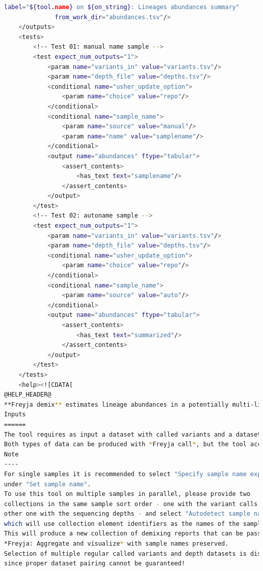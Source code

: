 \begin{lstlisting}[language=bash, caption=tool wrapper for Freyja: Demix lineage abundances, label=list:methods:wrapper-freyja-demix]
              label="${tool.name} on ${on_string}: Lineages abundances summary"
              from_work_dir="abundances.tsv"/>
    </outputs>
    <tests>
        <!-- Test 01: manual name sample -->
        <test expect_num_outputs="1">
            <param name="variants_in" value="variants.tsv"/>
            <param name="depth_file" value="depths.tsv"/>
            <conditional name="usher_update_option">
                <param name="choice" value="repo"/>
            </conditional>
            <conditional name="sample_name">
                <param name="source" value="manual"/>
                <param name="name" value="samplename"/>
            </conditional>
            <output name="abundances" ftype="tabular">
                <assert_contents>
                    <has_text text="samplename"/>
                </assert_contents>
            </output>
        </test>
        <!-- Test 02: autoname sample -->
        <test expect_num_outputs="1">
            <param name="variants_in" value="variants.tsv"/>
            <param name="depth_file" value="depths.tsv"/>
            <conditional name="usher_update_option">
                <param name="choice" value="repo"/>
            </conditional>
            <conditional name="sample_name">
                <param name="source" value="auto"/>
            </conditional>
            <output name="abundances" ftype="tabular">
                <assert_contents>
                    <has_text text="summarized"/>
                </assert_contents>
            </output>
        </test>
    </tests>
    <help><![CDATA[
@HELP_HEADER@
**Freyja demix** estimates lineage abundances in a potentially multi-lineage input sample.
Inputs
======
The tool requires as input a dataset with called variants and a dataset with genome-wide sequencing depth information.
Both types of data can be produced with *Freyja call*, but the tool accepts variant calls also in VCF format.
Note
----
For single samples it is recommended to select "Specify sample name explicitly"
under "Set sample name".
To use this tool on multiple samples in parallel, please provide two
collections in the same sample sort order - one with the variant calls, the
other one with the sequencing depths - and select "Autodetect sample name",
which will use collection element identifiers as the names of the samples.
This will produce a new collection of demixing reports that can be passed to
*Freyja: Aggregate and visualize* with sample names preserved.
Selection of multiple regular called variants and depth datasets is discouraged
since proper dataset pairing cannot be guaranteed!

\end{lstlisting}
